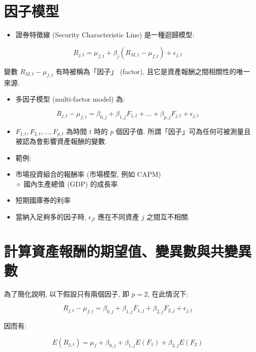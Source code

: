 \documentclass[letterpaper]{article}
\begin{document}
\section*{因子模型}
\begin{itemize}
	\item 證券特徵線 (Security Characteristic Line) 是一種迴歸模型: 
\end{itemize}


$$
R_{j, t}=\mu_{f, t}+\beta_{j}\left (R_{M, t}-\mu_{f, t}\right) +\epsilon_{j, t}
$$

變數 $R_{M, t}-\mu_{f, t}$ 有時被稱為「因子」 (factor), 且它是資產報酬之間相關性的唯一來源. 

\begin{itemize}
	\item 多因子模型 (multi-factor model) 為: 
\end{itemize}


$$
R_{j, t}-\mu_{f, t}=\beta_{0, j}+\beta_{1, j} F_{1, t}+\ldots+\beta_{p, j} F_{j, t}+\epsilon_{j, t}
$$

\begin{itemize}
	\item $F_{1, t}, F_{2, t}, \ldots, F_{p, t}$ 為時間 $t$ 時的 $p$ 個因子值. 所謂「因子」可為任何可被測量且被認為會影響資產報酬的變數. 
\end{itemize}

\begin{itemize}
	\item 範例: 
	\item 市場投資組合的報酬率 (市場模型, 例如 CAPM) \\
	$\diamond$ 國內生產總值 (GDP) 的成長率
	\item 短期國庫券的利率
	\item 當納入足夠多的因子時, $\epsilon_{j t}$ 應在不同資產 $j$ 之間互不相關. 
\end{itemize}

\section*{計算資產報酬的期望值、變異數與共變異數}
為了簡化說明, 以下假設只有兩個因子, 即 $p=2$, 在此情況下: 

$$
R_{j, t}-\mu_{f, t}=\beta_{0, j}+\beta_{1, j} F_{1, j}+\beta_{2, j} F_{2, j}+\epsilon_{j, t}
$$

因而有: 

$$
E\left (R_{j, t}\right) =\mu_{f}+\beta_{0, j}+\beta_{1, j} E\left (F_{1}\right) +\beta_{2, j} E\left (F_{2}\right) 
$$
\end{document}
